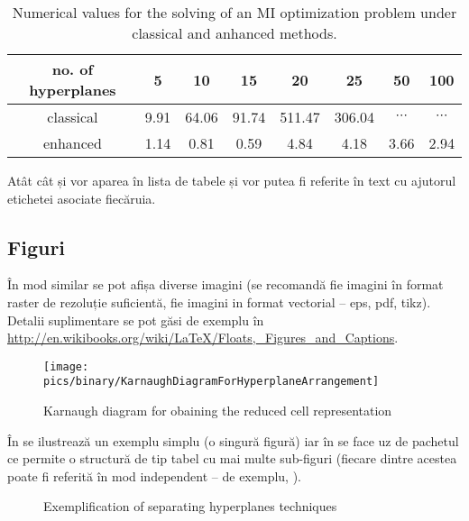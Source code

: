 \begin{table}[ht!]
\begin{center}
\begin{tabular}{|c|c|c|c|c|c|c|c|}
\hline
no. of hyperplanes&5&10&15&20&25&50&100\\ \hline
classical&9.91&64.06&91.74&511.47&306.04&$\cdots$&$\cdots$\\ \hline
enhanced&1.14&0.81&0.59&4.84&4.18&3.66&2.94\\ \hline
\end{tabular}
\end{center}
\caption{Numerical values for the solving of an MI optimization problem under classical and anhanced methods.}
\label{tab:run}
\end{table}

Atât  cât și  vor aparea în lista de tabele și vor putea fi referite în text cu ajutorul etichetei asociate fiecăruia.

\subsection{Figuri}
În mod similar se pot afișa diverse imagini (se recomandă fie imagini în format raster de rezoluție suficientă, fie imagini in format vectorial -- eps, pdf, tikz). Detalii suplimentare se pot găsi de exemplu în \url{http://en.wikibooks.org/wiki/LaTeX/Floats,_Figures_and_Captions}.

\begin{figure}[!ht]
\begin{center}\texttt{[image: \\pics/binary/KarnaughDiagramForHyperplaneArrangement]}\end{center}
	\caption{Karnaugh diagram for obaining the reduced cell representation}
	\label{fig:karnaugh}
\end{figure}

În  se ilustrează un exemplu simplu (o singură figură) iar în  se face uz de pachetul  ce permite o structură de tip tabel cu mai multe sub-figuri (fiecare dintre acestea poate fi referită în mod independent -- de exemplu, ).

\begin{figure}[!ht]
\begin{center}
	\caption{Exemplification of separating hyperplanes techniques}
	\label{fig:int}
\end{center}
\end{figure}


